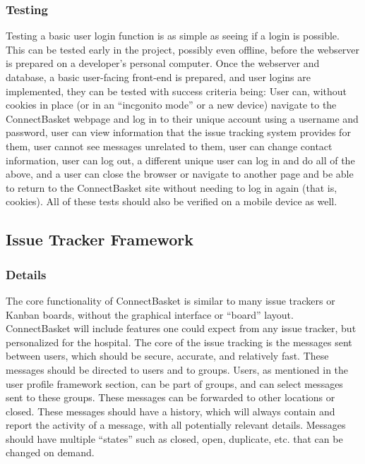 \documentclass[onecolumn, draftclsnofoot,10pt, compsoc]{IEEEtran}
\begin{document}
\subsubsection{Testing}
Testing a basic user login function is as simple as seeing if a login is possible. This can be tested early in the project, possibly even offline, before the webserver is prepared on a developer’s personal computer. Once the webserver and database, a basic user-facing front-end is prepared, and user logins are implemented, they can be tested with success criteria being: User can, without cookies in place (or in an “incgonito mode” or a new device) navigate to the ConnectBasket webpage and log in to their unique account using a username and password, user can view information that the issue tracking system provides for them, user cannot see messages unrelated to them, user can change contact information, user can log out, a different unique user can log in and do all of the above, and a user can close the browser or navigate to another page and be able to return to the ConnectBasket site without needing to log in again (that is, cookies). All of these tests should also be verified on a mobile device as well.


\subsection{Issue Tracker Framework}

\subsubsection{Details}
The core functionality of ConnectBasket is similar to many issue trackers or Kanban boards, without the graphical interface or “board” layout. ConnectBasket will include features one could expect from any issue tracker, but personalized for the hospital. The core of the issue tracking is the messages sent between users, which should be secure, accurate, and relatively fast. These messages should be directed to users and to groups. Users, as mentioned in the user profile framework section, can be part of groups, and can select messages sent to these groups. These messages can be forwarded to other locations or closed. These messages should have a history, which will always contain and report the activity of a message, with all potentially relevant details. Messages should have multiple “states” such as closed, open, duplicate, etc. that can be changed on demand.
\end{document}
